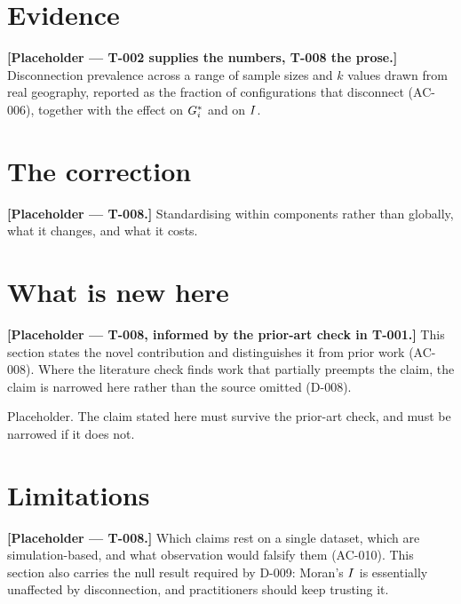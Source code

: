 \documentclass[11pt,a4paper]{article}
\begin{document}
\section{Evidence\EVIDENCE}
\label{sec:evidence}

\textbf{[Placeholder --- T-002 supplies the numbers, T-008 the prose.]}
Disconnection prevalence across a range of sample sizes and $k$ values drawn from
real geography, reported as the fraction of configurations that disconnect
(AC-006), together with the effect on $G_i^{*}$ and on $I$.

\section{The correction\CONTRIBUTION}
\label{sec:correction}

\textbf{[Placeholder --- T-008.]} Standardising within components rather than
globally, what it changes, and what it costs.

\section{What is new here\CONTRIBUTION}
\label{sec:new}

\textbf{[Placeholder --- T-008, informed by the prior-art check in T-001.]}
This section states the novel contribution and distinguishes it from prior work
(AC-008). Where the literature check finds work that partially preempts the
claim, the claim is narrowed here rather than the source omitted (D-008).

\begin{keyinsight}
Placeholder. The claim stated here must survive the prior-art check, and must be
narrowed if it does not.
\end{keyinsight}

\section{Limitations\LIMITATIONS}
\label{sec:limits}

\textbf{[Placeholder --- T-008.]} Which claims rest on a single dataset, which
are simulation-based, and what observation would falsify them (AC-010). This
section also carries the null result required by D-009: Moran's $I$ is
essentially unaffected by disconnection, and practitioners should keep trusting
it.
\end{document}
